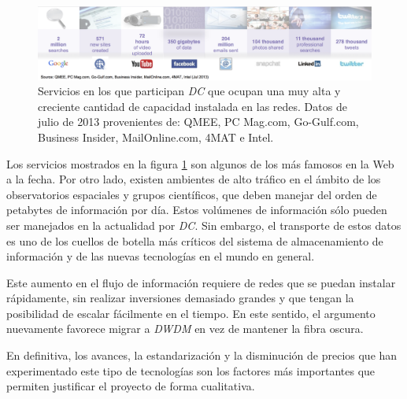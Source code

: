 \begin{figure}[H]
  \centering
  \includegraphics[width=15cm]{Imagenes/servicios.png}
  \caption{Servicios en los que participan \emph{DC} que ocupan una
    muy alta y creciente cantidad de capacidad instalada en las
    redes. Datos de julio de 2013 provenientes de: QMEE, PC Mag.com,
    Go-Gulf.com, Business Insider, MailOnline.com, 4MAT e Intel.}
  \label{fig:servicios}
\end{figure}

Los servicios mostrados en la figura \ref{fig:servicios} son algunos
de los más famosos en la Web a la fecha. Por otro lado, existen 
ambientes de alto tráfico en el ámbito de los observatorios espaciales
y grupos científicos, que deben manejar del orden de petabytes de
información por día. Estos volúmenes de información sólo pueden ser
manejados en la actualidad por \emph{DC}. Sin embargo, el
transporte de estos datos es uno de los cuellos de botella más
críticos del sistema de almacenamiento de información y de las nuevas
tecnologías en el mundo en general.

Este aumento en el flujo de información requiere de redes que se puedan
instalar rápidamente, sin realizar inversiones demasiado grandes y que
tengan la posibilidad de escalar fácilmente en el tiempo. En este
sentido, el argumento nuevamente favorece migrar a \emph{DWDM} en vez
de mantener la fibra oscura. 

En definitiva, los avances, la estandarización y la disminución de
precios que han experimentado este tipo de tecnologías son los
factores más importantes que permiten justificar el proyecto de forma
cualitativa.
